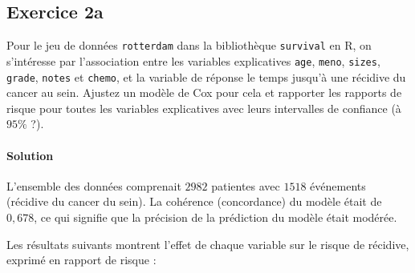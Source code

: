 \documentclass[../main.tex]{subfiles}
\begin{document}
\begin{CJK*}{UTF8}{gbsn}
\section*{Exercice 2a}
Pour le jeu de données 
\texttt{rotterdam} dans la bibliothèque \texttt{survival} en R, 
on s'intéresse par l'association entre les variables explicatives \texttt{age}, \texttt{meno}, 
\texttt{sizes}, \texttt{grade}, \texttt{notes} et \texttt{chemo},
et la variable de réponse le temps jusqu'à une récidive du cancer au sein.
Ajustez un modèle de Cox pour cela et rapporter 
les rapports de risque pour toutes les variables explicatives avec leurs intervalles de confiance (à $95\%$ ?).

\paragraph{Solution}

L'ensemble des données comprenait $2982$ patientes avec $1518$ événements 
(récidive du cancer du sein). 
La cohérence (concordance) du modèle était de $0,678$, 
ce qui signifie que la précision de la prédiction du modèle était modérée.

Les résultats suivants montrent l'effet de chaque variable sur le risque de récidive, 
exprimé en rapport de risque :


\end{CJK*}
\end{document}
